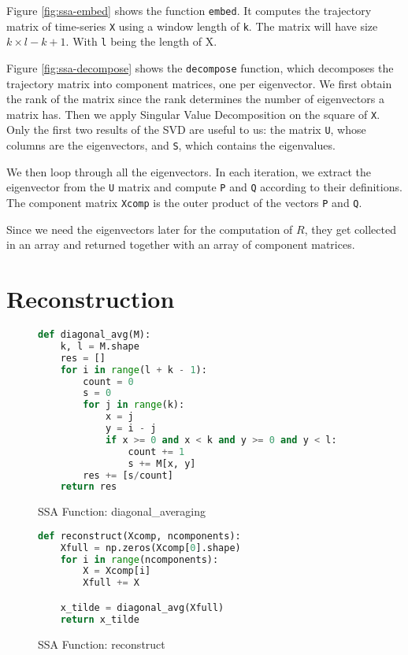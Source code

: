 Figure \ref{fig:ssa-embed} shows the function \texttt{embed}. It computes the trajectory matrix of time-series \texttt{X} using a window length of \texttt{k}. The matrix will have size $k \times l-k+1$. With \texttt{l} being the length of X. 

Figure \ref{fig:ssa-decompose} shows the \texttt{decompose} function, which decomposes the trajectory matrix into component matrices, one per eigenvector.  We first obtain the rank of the matrix since the rank determines the number of eigenvectors a matrix has. Then we apply Singular Value Decomposition on the square of \texttt{X}. Only the first two results of the SVD are useful to us: the matrix \texttt{U}, whose columns are the eigenvectors, and \texttt{S}, which contains the eigenvalues. 

We then loop through all the eigenvectors. In each iteration, we extract the eigenvector from the \texttt{U} matrix and compute \texttt{P} and \texttt{Q} according to their definitions. The component matrix \texttt{Xcomp} is the outer product of the vectors \texttt{P} and \texttt{Q}. 

Since we need the eigenvectors later for the computation of $R$, they get collected in an array and returned together with an array of component matrices. 

\section{Reconstruction}

\begin{figure}
\begin{singlespace}
\begin{lstlisting}[language=Python]
def diagonal_avg(M):
    k, l = M.shape
    res = []
    for i in range(l + k - 1):
        count = 0
        s = 0
        for j in range(k):
            x = j
            y = i - j
            if x >= 0 and x < k and y >= 0 and y < l:
                count += 1
                s += M[x, y]
        res += [s/count]
    return res
\end{lstlisting}
\end{singlespace}
\caption{SSA Function: diagonal\_averaging}    
\label{fig:ssa-diag-avg}
\end{figure}

\begin{figure}
\begin{singlespace}
\begin{lstlisting}[language=Python]
def reconstruct(Xcomp, ncomponents):
    Xfull = np.zeros(Xcomp[0].shape)
    for i in range(ncomponents):
        X = Xcomp[i]
        Xfull += X

    x_tilde = diagonal_avg(Xfull)
    return x_tilde
\end{lstlisting}
\end{singlespace}
\caption{SSA Function: reconstruct}    
\label{fig:ssa-reconstruct}
\end{figure}


